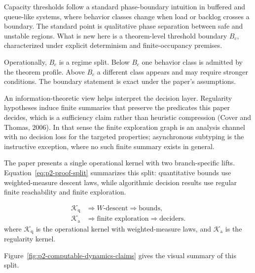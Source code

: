\documentclass[a4paper,10pt,twocolumn,english]{article}
\numberwithin{equation}{section}
\theoremstyle{paperdef}
\theoremstyle{paperplain}
\theoremstyle{paperdef}
\theoremstyle{paperremark}
\newcommand{\Bc}{\ensuremath{B_c}}
\begin{document}
Capacity thresholds follow a standard phase-boundary intuition in buffered and queue-like systems,
where behavior classes change when load or backlog crosses a boundary. The standard point is
qualitative phase separation between safe and unstable regions. What is new here is a theorem-level
threshold boundary $\Bc$, characterized under explicit determinism and finite-occupancy premises.

Operationally, $\Bc$ is a regime split. Below $\Bc$ one behavior class is admitted by the theorem
profile. Above $\Bc$ a different class appears and may require stronger conditions. The boundary
statement is exact under the paper's assumptions.

An information-theoretic view helps interpret the decision layer. Regularity hypotheses induce
finite summaries that preserve the predicates this paper decides, which is a sufficiency
claim rather than heuristic compression (Cover and Thomas, 2006). In that sense the finite
exploration graph is an analysis channel with no decision loss for the targeted properties;
asynchronous subtyping is the instructive exception, where no such finite summary exists in general.

The paper presents a single operational kernel with two branch-specific lifts. Equation~\ref{eq:p2-proof-split} summarizes this split: quantitative bounds use weighted-measure descent laws, while algorithmic decision results use regular finite reachability and finite exploration.

\begingroup
\setlength{\abovedisplayskip}{3pt}
\setlength{\abovedisplayshortskip}{3pt}
\begin{equation}
	\label{eq:p2-proof-split}
	\begin{aligned}
		\mathcal{K}_{\mathrm{q}} & \Longrightarrow W\text{-descent}
		\Longrightarrow \text{bounds},                                       \\
		\mathcal{K}_{\mathrm{a}} & \Longrightarrow \text{finite exploration}
		\Longrightarrow \text{deciders}.
	\end{aligned}
\end{equation}
\noindent where $\mathcal{K}_{\mathrm{q}}$ is the operational kernel with weighted-measure laws,
and $\mathcal{K}_{\mathrm{a}}$ is the regularity kernel.
\endgroup

Figure~\ref{fig:p2-computable-dynamics-claims} gives the visual summary of this split.
\end{document}
